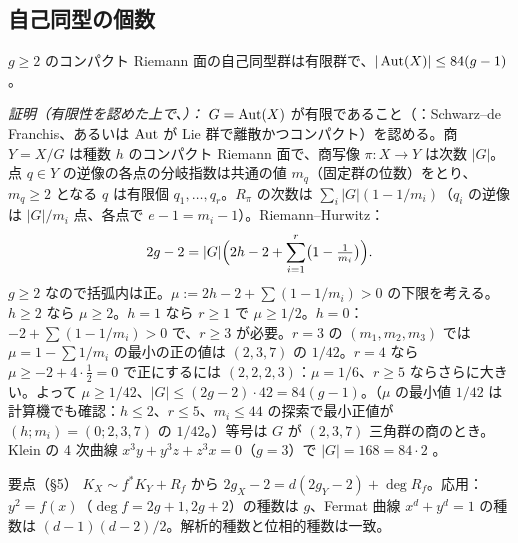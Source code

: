 \subsection{自己同型の個数}
\begin{thm}
$g\ge2$ のコンパクト Riemann 面の自己同型群は有限群で、$|\operatorname{Aut}(X)|\le84(g-1)$。
\end{thm}
\emph{証明（有限性を認めた上で、\tP）：} $G=\operatorname{Aut}(X)$ が有限であること（\tC：Schwarz--de Franchis、あるいは $\operatorname{Aut}$ が Lie 群で離散かつコンパクト）を認める。商 $Y=X/G$ は種数 $h$ のコンパクト Riemann 面で、商写像 $\pi:X\to Y$ は次数 $|G|$。点 $q\in Y$ の逆像の各点の分岐指数は共通の値 $m_q$（固定群の位数）をとり、$m_q\ge2$ となる $q$ は有限個 $q_1,\dots,q_r$。$R_\pi$ の次数は $\sum_i|G|(1-1/m_i)$（$q_i$ の逆像は $|G|/m_i$ 点、各点で $e-1=m_i-1$）。Riemann--Hurwitz：
\[
2g-2=|G|\Bigl(2h-2+\sum_{i=1}^r\bigl(1-\tfrac1{m_i}\bigr)\Bigr).
\]
$g\ge2$ なので括弧内は正。$\mu:=2h-2+\sum(1-1/m_i)>0$ の下限を考える。$h\ge2$ なら $\mu\ge2$。$h=1$ なら $r\ge1$ で $\mu\ge1/2$。$h=0$：$-2+\sum(1-1/m_i)>0$ で、$r\ge3$ が必要。$r=3$ の $(m_1,m_2,m_3)$ では $\mu=1-\sum1/m_i$ の最小の正の値は $(2,3,7)$ の $1/42$。$r=4$ なら $\mu\ge-2+4\cdot\frac12=0$ で正にするには $(2,2,2,3)$：$\mu=1/6$、$r\ge5$ ならさらに大きい。よって $\mu\ge1/42$、$|G|\le(2g-2)\cdot42=84(g-1)$。（$\mu$ の最小値 $1/42$ は計算機でも確認：$h\le2$、$r\le5$、$m_i\le44$ の探索で最小正値が $(h;m_i)=(0;2,3,7)$ の $1/42$。）等号は $G$ が $(2,3,7)$ 三角群の商のとき。Klein の 4 次曲線 $x^3y+y^3z+z^3x=0$（$g=3$）で $|G|=168=84\cdot2$ \tC。

\begin{keybox}{要点（§5）}
$K_X\sim f^*K_Y+R_f$ から $2g_X-2=d(2g_Y-2)+\deg R_f$。応用：$y^2=f(x)$（$\deg f=2g+1,2g+2$）の種数は $g$、Fermat 曲線 $x^d+y^d=1$ の種数は $(d-1)(d-2)/2$。解析的種数と位相的種数は一致。
\end{keybox}

